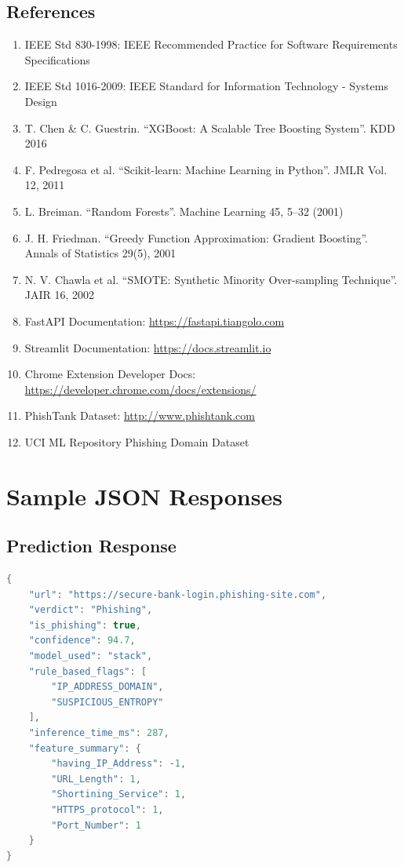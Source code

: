 \documentclass[12pt,a4paper]{report}
\begin{document}
\section{References}

\begin{enumerate}[leftmargin=*]
    \item IEEE Std 830-1998: IEEE Recommended Practice for Software Requirements Specifications
    \item IEEE Std 1016-2009: IEEE Standard for Information Technology - Systems Design
    \item T. Chen \& C. Guestrin. ``XGBoost: A Scalable Tree Boosting System''. KDD 2016
    \item F. Pedregosa et al. ``Scikit-learn: Machine Learning in Python''. JMLR Vol. 12, 2011
    \item L. Breiman. ``Random Forests''. Machine Learning 45, 5--32 (2001)
    \item J. H. Friedman. ``Greedy Function Approximation: Gradient Boosting''. Annals of Statistics 29(5), 2001
    \item N. V. Chawla et al. ``SMOTE: Synthetic Minority Over-sampling Technique''. JAIR 16, 2002
    \item FastAPI Documentation: \url{https://fastapi.tiangolo.com}
    \item Streamlit Documentation: \url{https://docs.streamlit.io}
    \item Chrome Extension Developer Docs: \url{https://developer.chrome.com/docs/extensions/}
    \item PhishTank Dataset: \url{http://www.phishtank.com}
    \item UCI ML Repository Phishing Domain Dataset
\end{enumerate}

\appendix

\chapter{Sample JSON Responses}

\section{Prediction Response}

\begin{lstlisting}[language=java]
{
    "url": "https://secure-bank-login.phishing-site.com",
    "verdict": "Phishing",
    "is_phishing": true,
    "confidence": 94.7,
    "model_used": "stack",
    "rule_based_flags": [
        "IP_ADDRESS_DOMAIN",
        "SUSPICIOUS_ENTROPY"
    ],
    "inference_time_ms": 287,
    "feature_summary": {
        "having_IP_Address": -1,
        "URL_Length": 1,
        "Shortining_Service": 1,
        "HTTPS_protocol": 1,
        "Port_Number": 1
    }
}
\end{lstlisting}
\end{document}
